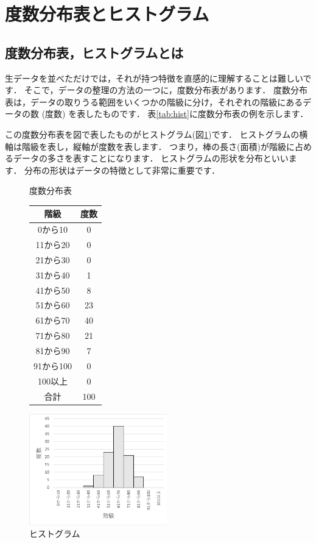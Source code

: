\section{度数分布表とヒストグラム}

\subsection{度数分布表，ヒストグラムとは}

生データを並べただけでは，それが持つ特徴を直感的に理解することは難しいです．
そこで，データの整理の方法の一つに，度数分布表があります．
度数分布表は，データの取りうる範囲をいくつかの階級に分け，それぞれの階級にあるデータの数 (度数) を表したものです．
表\ref{tab:hist}に度数分布表の例を示します．

この度数分布表を図で表したものがヒストグラム(図\ref{fig:histogram})です．
ヒストグラムの横軸は階級を表し，縦軸が度数を表します．
つまり，棒の長さ(面積)が階級に占めるデータの多さを表すことになります．
ヒストグラムの形状を分布といいます．
分布の形状はデータの特徴として非常に重要です．

\begin{figure}[tb]
    \begin{minipage}{0.5\hsize}
        \makeatletter
        \def\@captype{table}
        \makeatother
        \centering
        \caption{度数分布表}
        \begin{tabular}{c|c}
          階級       & 度数 \\ \hline
          0から10    & 0 \\
          11から20   & 0 \\
          21から30   & 0 \\
          31から40   & 1 \\
          41から50   & 8 \\
          51から60   & 23\\
          61から70   & 40\\
          71から80   & 21\\
          81から90   & 7 \\
          91から100  & 0 \\
          100以上    & 0 \\
          合計       & 100
        \end{tabular}
        \label{tab:hist}
    \end{minipage}
    \begin{minipage}{0.5\hsize}
        \centering
        \includegraphics[width=6cm]{chap1/hist.png}
        \caption{ヒストグラム}
        \label{fig:histogram}
    \end{minipage}
\end{figure}

